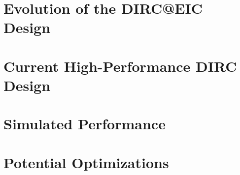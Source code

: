 \label{ch:eicdirc}

\section{Evolution of the DIRC@EIC Design}

\section{Current High-Performance DIRC Design}

\section{Simulated Performance}

\section{Potential Optimizations}